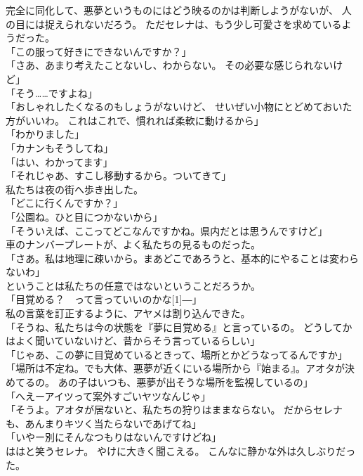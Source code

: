 \documentclass[../IHMain]{subfiles}
\begin{document}
完全に同化して、悪夢というものにはどう映るのかは判断しようがないが、
人の目には捉えられないだろう。
ただセレナは、もう少し可愛さを求めているようだった。\\
「この服って好きにできないんですか？」\\
「さあ、あまり考えたことないし、わからない。
その必要な感じられないけど」\\
「そう……ですよね」\\
「おしゃれしたくなるのもしょうがないけど、
せいぜい小物にとどめておいた方がいいわ。
これはこれで、慣れれば柔軟に動けるから」\\
「わかりました」\\
「カナンもそうしてね」\\
「はい、わかってます」\\
「それじゃあ、すこし移動するから。ついてきて」\\
私たちは夜の街へ歩き出した。\\
「どこに行くんですか？」\\
「公園ね。ひと目につかないから」\\
「そういえば、ここってどこなんですかね。県内だとは思うんですけど」\\
車のナンバープレートが、よく私たちの見るものだった。\\
「さあ。私は地理に疎いから。まあどこであろうと、基本的にやることは変わらないわ」\\
ということは私たちの任意ではないということだろうか。\\
「目覚める？　って言っていいのかな\scalebox{3}[1]{―}」\\
私の言葉を訂正するように、アヤメは割り込んできた。\\
「そうね、私たちは今の状態を『夢に目覚める』と言っているの。
どうしてかはよく聞いていないけど、昔からそう言っているらしい」\\
「じゃあ、この夢に目覚めているときって、場所とかどうなってるんですか」\\
「場所は不定ね。でも大体、悪夢が近くにいる場所から『始まる』。アオタが決めてるの。
あの子はいつも、悪夢が出そうな場所を監視しているの」\\
「へえーアイツって案外すごいヤツなんじゃ」\\
「そうよ。アオタが居ないと、私たちの狩りはままならない。
だからセレナも、あんまりキツく当たらないであげてね」\\
「いやー別にそんなつもりはないんですけどね」\\
ははと笑うセレナ。
やけに大きく聞こえる。
こんなに静かな外は久しぶりだった。
\end{document}
